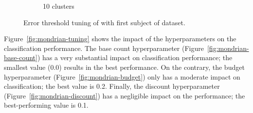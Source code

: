 \begin{figure}
\begin{subfigure}[b]{0.49\textwidth}
		 \caption{10 clusters}
	 \end{subfigure}
	\caption{Error threshold tuning of \mcnn with first subject of \banosdataset dataset.}
	\label{fig:mcnn-tuning-error}
\end{figure}

Figure~\ref{fig:mondrian-tuning} shows the impact of the \mondrianforest hyperparameters on
the classification performance. 
The base count hyperparameter (Figure~\ref{fig:mondrian-base-count}) has a
very substantial impact on classification performance; the smallest value
(0.0) results in the best performance. On the contrary, the
budget hyperparameter (Figure~\ref{fig:mondrian-budget}) only has a
moderate impact on classification; the best value is 0.2. Finally, the discount hyperparameter
(Figure~\ref{fig:mondrian-discount}) has a negligible impact on the
performance; the best-performing value is 0.1.


